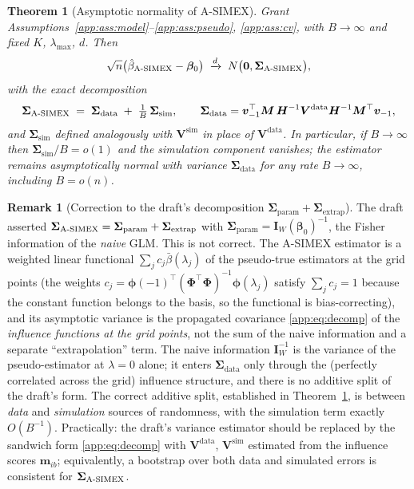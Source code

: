\documentclass[11pt]{article}
\theoremstyle{plain}
\newtheorem{theorem}{Theorem}
\theoremstyle{definition}
\newtheorem{remark}{Remark}
\newcommand{\bet}{\bm{\beta}}
\newcommand{\bSig}{\bm{\Sigma}}
\newcommand{\bPhi}{\bm{\Phi}}
\newcommand{\bphi}{\bm{\phi}}
\newcommand{\btH}{\bm{H}}
\newcommand{\btV}{\bm{V}}
\newcommand{\asimex}{\textup{A-SIMEX}}
\begin{document}
\begin{theorem}[Asymptotic normality of \asimex{}]\label{app:thm:an}
Grant Assumptions~\ref{app:ass:model}--\ref{app:ass:pseudo}, \ref{app:ass:cv}, with
$B\to\infty$ and fixed $K$, $\lambda_{\max}$, $d$. Then
\[
  \sqrt n\bigl(\hat\beta_{\asimex}-\bet_0\bigr)
  \;\xrightarrow{d}\;N\bigl(\bm 0,\bSig_{\asimex}\bigr),
\]
with the exact decomposition
\begin{equation}\label{app:eq:decomp}
  \bSig_{\asimex}
  \;=\;\bSig_{\mathrm{data}}\;+\;\tfrac1B\,\bSig_{\mathrm{sim}},
  \qquad
  \bSig_{\mathrm{data}}=\bm v_{-1}^\top\bm M\,
    \btH^{-1}\btV^{\mathrm{data}}\btH^{-1}\bm M^\top\bm v_{-1},
\end{equation}
and $\bSig_{\mathrm{sim}}$ defined analogously with
$\btV^{\mathrm{sim}}$ in place of $\btV^{\mathrm{data}}$. In particular,
if $B\to\infty$ then $\bSig_{\mathrm{sim}}/B=o(1)$ and the simulation
component vanishes; the estimator remains asymptotically normal with
variance $\bSig_{\mathrm{data}}$ for \emph{any} rate $B\to\infty$,
including $B=o(n)$.
\end{theorem}

\begin{remark}[Correction to the draft's decomposition
$\bSig_{\mathrm{param}}+\bSig_{\mathrm{extrap}}$]\label{app:rem:decomp}
The draft asserted
$\bSig_{\asimex}=\bSig_{\mathrm{param}}+\bSig_{\mathrm{extrap}}$ with
$\bSig_{\mathrm{param}}=\bm I_W(\bet_0)^{-1}$, the Fisher information of
the \emph{naive} GLM. This is not correct. The \asimex{} estimator is a
weighted linear functional $\sum_j c_j\bar\beta(\lambda_j)$ of the
pseudo-true estimators at the grid points (the weights
$c_j=\bphi(-1)^\top(\bPhi^\top\bPhi)^{-1}\bphi(\lambda_j)$ satisfy
$\sum_j c_j=1$ because the constant function belongs to the basis, so the
functional is bias-correcting), and its asymptotic variance is the
propagated covariance \eqref{app:eq:decomp} of the \emph{influence functions
at the grid points}, not the sum of the naive information and a separate
``extrapolation'' term. The naive information $\bm I_W^{-1}$ is the
variance of the pseudo-estimator at $\lambda=0$ alone; it enters
$\bSig_{\mathrm{data}}$ only through the (perfectly correlated across the
grid) influence structure, and there is no additive split of the
draft's form. The correct additive split, established in
Theorem~\ref{app:thm:an}, is between \emph{data} and \emph{simulation}
sources of randomness, with the simulation term exactly $O(B^{-1})$.
Practically: the draft's variance estimator should be replaced by the
sandwich form \eqref{app:eq:decomp} with $\btV^{\mathrm{data}}$,
$\btV^{\mathrm{sim}}$ estimated from the influence scores
$\bm m_{ib}$; equivalently, a bootstrap over both data and simulated
errors is consistent for $\bSig_{\asimex}$.
\end{remark}
\end{document}
